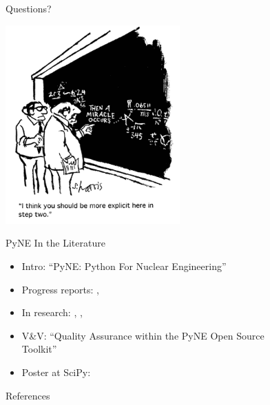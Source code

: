 \documentclass[xcolor=x11names,compress]{beamer}
\renewcommand{\(}{\begin{columns}}
\renewcommand{\)}{\end{columns}}
\newcommand{\<}[1]{\begin{column}{#1}}
\renewcommand{\>}{\end{column}}
\begin{document}
\section*{}
\begin{frame}[fragile]{Questions?}

    \begin{center}
    \includegraphics[height=3in,clip]{questions-comic.png}  
    \end{center}
  
\end{frame}

\begin{frame}[fragile]{PyNE In the Literature}

    \begin{itemize}
    \item Intro: ``PyNE: Python For Nuclear Engineering'' \cite{pyne_intro}
    \item Progress reports: \cite{scopatz_pyne}, \cite{pyne_progress}
    \item In research: \cite{Biondo2014}, \cite{MarquezDamian2014280}, \cite{Scopatz2013a}
    \item V\&V: ``Quality Assurance within the PyNE Open Source \\Toolkit'' \cite{pyne_vnv}
    \item Poster at SciPy: \cite{scipy}
    \end{itemize}
  
\end{frame}
\begin{frame}[allowframebreaks]{References}
	
	
\end{frame}
\end{document}
